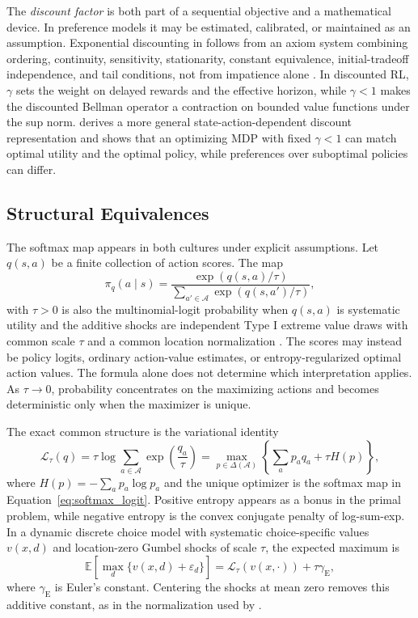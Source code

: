 The \emph{discount factor} is both part of a sequential objective and a mathematical device. In preference models it may be estimated, calibrated, or maintained as an assumption. Exponential discounting in \citet{Koopmans1960} follows from an axiom system combining ordering, continuity, sensitivity, stationarity, constant equivalence, initial-tradeoff independence, and tail conditions, not from impatience alone \citep{Bleichrodt2008}. In discounted RL, $\gamma$ sets the weight on delayed rewards and the effective horizon, while $\gamma<1$ makes the discounted Bellman operator a contraction on bounded value functions under the sup norm. \citet{Pitis2019} derives a more general state-action-dependent discount representation and shows that an optimizing MDP with fixed $\gamma<1$ can match optimal utility and the optimal policy, while preferences over suboptimal policies can differ.

\subsection{Structural Equivalences}
\label{subsec:structural_equivalences}

The softmax map appears in both cultures under explicit assumptions. Let $q(s,a)$ be a finite collection of action scores. The map
\begin{equation}
\label{eq:softmax_logit}
\pi_q(a \mid s) = \frac{\exp(q(s,a) / \tau)}{\sum_{a' \in \mathcal{A}} \exp(q(s,a') / \tau)},
\end{equation}
with $\tau>0$ is also the multinomial-logit probability when $q(s,a)$ is systematic utility and the additive shocks are independent Type I extreme value draws with common scale $\tau$ and a common location normalization \citep{McFadden1974}. The scores may instead be policy logits, ordinary action-value estimates, or entropy-regularized optimal action values. The formula alone does not determine which interpretation applies. As $\tau\to0$, probability concentrates on the maximizing actions and becomes deterministic only when the maximizer is unique.

The exact common structure is the variational identity
\begin{equation}
\label{eq:soft_value}
\mathcal{L}_{\tau}(q)
=\tau\log\sum_{a\in\mathcal{A}}\exp\!\left(\frac{q_a}{\tau}\right)
=\max_{p\in\Delta(\mathcal{A})}
\left\{\sum_a p_a q_a+\tau H(p)\right\},
\end{equation}
where $H(p)=-\sum_a p_a\log p_a$ and the unique optimizer is the softmax map in Equation~\eqref{eq:softmax_logit}. Positive entropy appears as a bonus in the primal problem, while negative entropy is the convex conjugate penalty of log-sum-exp. In a dynamic discrete choice model with systematic choice-specific values $v(x,d)$ and location-zero Gumbel shocks of scale $\tau$, the expected maximum is
\[
\mathbb{E}\!\left[\max_d\{v(x,d)+\varepsilon_d\}\right]
=\mathcal{L}_{\tau}(v(x,\cdot))+\tau\gamma_{\mathrm E},
\]
where $\gamma_{\mathrm E}$ is Euler's constant. Centering the shocks at mean zero removes this additive constant, as in the normalization used by \citet{Rust1987}.

